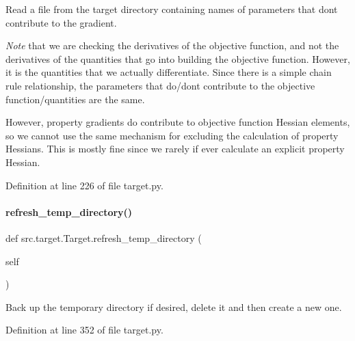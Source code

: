 Read a file from the target directory containing names of parameters that don\textquotesingle{}t contribute to the gradient. 

{\itshape Note} that we are checking the derivatives of the objective function, and not the derivatives of the quantities that go into building the objective function. However, it is the quantities that we actually differentiate. Since there is a simple chain rule relationship, the parameters that do/don\textquotesingle{}t contribute to the objective function/quantities are the same.

However, property gradients do contribute to objective function Hessian elements, so we cannot use the same mechanism for excluding the calculation of property Hessians. This is mostly fine since we rarely if ever calculate an explicit property Hessian. 

Definition at line 226 of file target.\+py.

\mbox{\label{classsrc_1_1target_1_1Target_ad8126429a9b72dff627da96934cd7f5c}} 
\paragraph{\texorpdfstring{refresh\+\_\+temp\+\_\+directory()}{refresh\_temp\_directory()}}
{\footnotesize\ttfamily def src.\+target.\+Target.\+refresh\+\_\+temp\+\_\+directory (\begin{DoxyParamCaption}\item[{}]{self }\end{DoxyParamCaption})\hspace{0.3cm}{\ttfamily [inherited]}}



Back up the temporary directory if desired, delete it and then create a new one. 



Definition at line 352 of file target.\+py.

